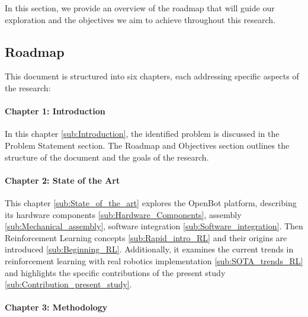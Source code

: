 \documentclass[12pt]{report}
\begin{document}
In this section, we provide an overview of the roadmap that will guide our exploration and the objectives we aim to achieve throughout this research.


\subsection{Roadmap}
This document is structured into six chapters, each addressing specific aspects of the research:

\paragraph{Chapter 1: Introduction}
In this chapter \ref{sub:Introduction}, the identified problem is discussed in the Problem Statement section. The Roadmap and Objectives section outlines the structure of the document and the goals of the research.

\paragraph{Chapter 2: State of the Art}
This chapter \ref{sub:State_of_the_art} explores the OpenBot platform, describing its hardware components \ref{sub:Hardware_Components}, assembly \ref{sub:Mechanical_assembly}, software integration \ref{sub:Software_integration}. Then Reinforcement Learning concepts \ref{sub:Rapid_intro_RL} and their origins are introduced \ref{sub:Beginning_RL}. Additionally, it examines the current trends in reinforcement learning with real robotics implementation \ref{sub:SOTA_trends_RL} and highlights the specific contributions of the present study \ref{sub:Contribution_present_study}.

\paragraph{Chapter 3: Methodology}
\end{document}
